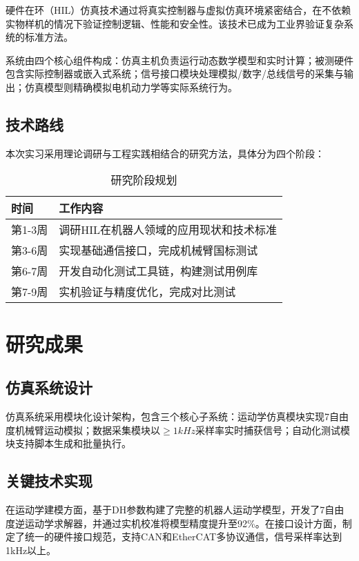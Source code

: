 \documentclass[12pt]{article}
\begin{document}
硬件在环（HIL）仿真技术通过将真实控制器与虚拟仿真环境紧密结合，在不依赖实物样机的情况下验证控制逻辑、性能和安全性。该技术已成为工业界验证复杂系统的标准方法。

系统由四个核心组件构成：仿真主机负责运行动态数学模型和实时计算；被测硬件包含实际控制器或嵌入式系统；信号接口模块处理模拟/数字/总线信号的采集与输出；仿真模型则精确模拟电机动力学等实际系统行为。

\subsection{技术路线}

本次实习采用理论调研与工程实践相结合的研究方法，具体分为四个阶段：

\begin{table}[H]
\centering
\caption{研究阶段规划}
\begin{tabular}{p{2.5cm}p{9cm}}
\toprule
\textbf{时间} & \textbf{工作内容} \\
\midrule
第1-3周 & 调研HIL在机器人领域的应用现状和技术标准 \\
第3-6周 & 实现基础通信接口，完成机械臂国标测试 \\
第6-7周 & 开发自动化测试工具链，构建测试用例库 \\
第7-9周 & 实机验证与精度优化，完成对比测试 \\
\bottomrule
\end{tabular}
\end{table}

\section{研究成果}
\subsection{仿真系统设计}

仿真系统采用模块化设计架构，包含三个核心子系统：运动学仿真模块实现7自由度机械臂运动模拟；数据采集模块以$\geqslant 1kHz$采样率实时捕获信号；自动化测试模块支持脚本生成和批量执行。


\subsection{关键技术实现}

在运动学建模方面，基于DH参数构建了完整的机器人运动学模型，开发了7自由度逆运动学求解器，并通过实机校准将模型精度提升至92\%。在接口设计方面，制定了统一的硬件接口规范，支持CAN和EtherCAT多协议通信，信号采样率达到1kHz以上。
\end{document}
